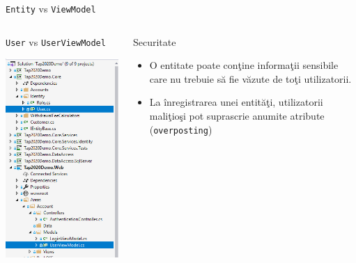 \documentclass[presentation]{beamer}
\begin{document}
\begin{frame}[label={sec:org42e4c76},fragile]{\texttt{Entity} vs \texttt{ViewModel}}
 \begin{columns}
\begin{column}{0.4\columnwidth}
\begin{block}{\texttt{User} vs \texttt{UserViewModel}}
\begin{center}
\includegraphics[height=.8\textheight]{img/entity-vs-view-model.png}
\end{center}
\end{block}
\end{column}
\begin{column}{0.6\columnwidth}
\begin{block}{Securitate}
\begin{itemize}
\item O entitate poate conţine informaţii sensibile care nu trebuie să fie văzute de toţi utilizatorii.
\item La înregistrarea unei entităţi, utilizatorii maliţioşi pot suprascrie anumite atribute (\texttt{overposting})
\end{itemize}
\end{block}
\end{column}
\end{columns}
\end{frame}
\end{document}

